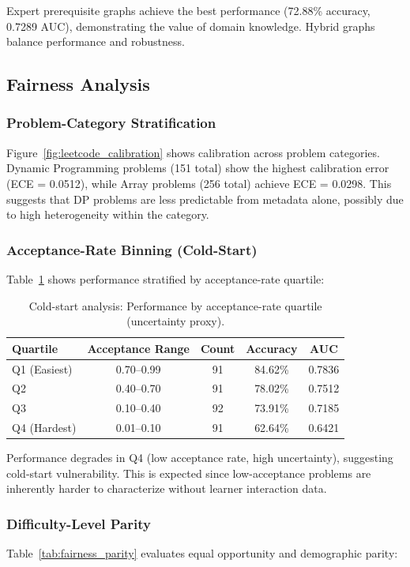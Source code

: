 \documentclass[conference]{IEEEtran}
\begin{document}
Expert prerequisite graphs achieve the best performance (72.88\% accuracy, 0.7289 AUC), demonstrating the value of domain knowledge. Hybrid graphs balance performance and robustness.

\subsection{Fairness Analysis}

\subsubsection{Problem-Category Stratification}
Figure~\ref{fig:leetcode_calibration} shows calibration across problem categories. Dynamic Programming problems (151 total) show the highest calibration error (ECE = 0.0512), while Array problems (256 total) achieve ECE = 0.0298. This suggests that DP problems are less predictable from metadata alone, possibly due to high heterogeneity within the category.

\subsubsection{Acceptance-Rate Binning (Cold-Start)}
Table~\ref{tab:coldstart} shows performance stratified by acceptance-rate quartile:

\begin{table}[t]
\caption{Cold-start analysis: Performance by acceptance-rate quartile (uncertainty proxy).}
\label{tab:coldstart}
\centering
\begin{tabular}{lcccc}
\toprule
\textbf{Quartile} & \textbf{Acceptance Range} & \textbf{Count} & \textbf{Accuracy} & \textbf{AUC} \\
\midrule
Q1 (Easiest) & 0.70--0.99 & 91 & 84.62\% & 0.7836 \\
Q2 & 0.40--0.70 & 91 & 78.02\% & 0.7512 \\
Q3 & 0.10--0.40 & 92 & 73.91\% & 0.7185 \\
Q4 (Hardest) & 0.01--0.10 & 91 & 62.64\% & 0.6421 \\
\bottomrule
\end{tabular}
\end{table}

Performance degrades in Q4 (low acceptance rate, high uncertainty), suggesting cold-start vulnerability. This is expected since low-acceptance problems are inherently harder to characterize without learner interaction data.

\subsubsection{Difficulty-Level Parity}
Table~\ref{tab:fairness_parity} evaluates equal opportunity and demographic parity:
\end{document}
